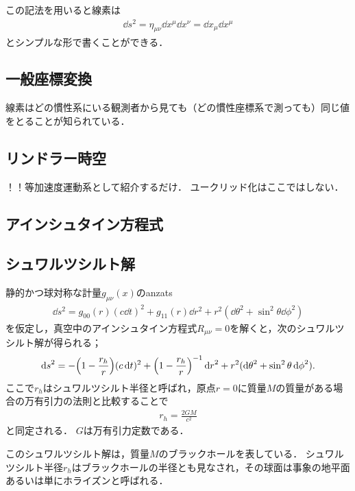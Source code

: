 \documentclass[uplatex,dvipdfmx]{vkaishi}
\begin{document}
この記法を用いると線素は
\begin{align}
  \dd{s}^2
  = \eta_{\mu\nu} \dd{x}^\mu \dd{x}^\nu
  = \dd{x}_\mu \dd{x}^\mu
\end{align}
とシンプルな形で書くことができる．


\subsection{一般座標変換}

線素はどの慣性系にいる観測者から見ても（どの慣性座標系で測っても）同じ値をとることが知られている．



\subsection{リンドラー時空}
！！等加速度運動系として紹介するだけ．
ユークリッド化はここではしない．


\subsection{アインシュタイン方程式}



\subsection{シュワルツシルト解}

静的かつ球対称な計量$g_{\mu\nu}(x)$のanzats
\begin{align*}
  \dd{s}^2 = g_{00}(r) (c\dd{t})^2 + g_{11}(r) \dd{r}^2 + r^2 (\dd{\theta}^2 + \sin^2\theta \dd{\phi}^2)
\end{align*}
を仮定し，真空中のアインシュタイン方程式$R_{\mu\nu} = 0$を解くと，次のシュワルツシルト解が得られる；
\begin{align}
  \dd{s}^2 = - \qty(1 - \frac{r_h}{r}) (c\dd{t})^2 + \qty(1 - \frac{r_h}{r})^{-1} \dd{r}^2 + r^2 (\dd{\theta}^2 + \sin^2\theta \dd{\phi}^2).
  \label{eq:Schwarzschild}
\end{align}
ここで$r_h$はシュワルツシルト半径と呼ばれ，原点$r=0$に質量$M$の質量がある場合の万有引力の法則と比較することで
\begin{align}
  r_h = \frac{2GM}{c^2}
\end{align}
と同定される．
$G$は万有引力定数である．

このシュワルツシルト解は，質量$M$のブラックホールを表している．
シュワルツシルト半径$r_h$はブラックホールの半径とも見なされ，その球面は事象の地平面あるいは単にホライズンと呼ばれる．
\end{document}
